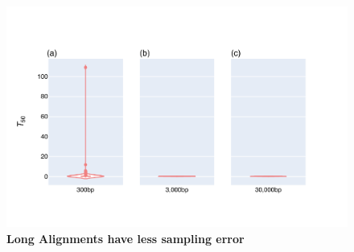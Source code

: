 \begin{figure}[!ht]
\centering
\includegraphics[width=\textwidth]{figures/plots/synthetic/T50/HighJSDLowEntropy-seq_len.pdf}\caption{\textbf{Long Alignments have less sampling error}}
\label{fig:T50-short_long}
\end{figure}